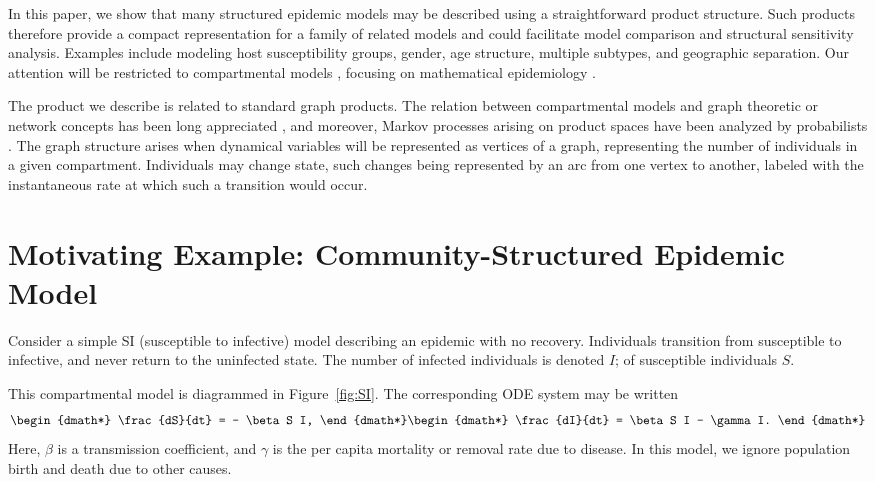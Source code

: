 \documentclass[review]{elsarticle}
\newcommand{\hl}[1]{#1}
\begin{document}
In this paper, we show that many structured epidemic models
may be described using a straightforward
product structure.  Such products therefore provide a compact representation for
a family of related models and could facilitate model comparison
and structural sensitivity analysis.
Examples include modeling
host susceptibility groups, gender, age structure, multiple subtypes, and geographic separation.
Our attention will be restricted to compartmental models
\cite{jacquez1972compartmental,matis2012stochastic,anderson1991infectious},
focusing on mathematical epidemiology \cite{kermack1927contribution,bailey1975,hethcote1976,anderson-may1991,hethcote1994,hethcote2000,vandendriessche-watmough2002,martcheva2015}.

The product we describe is related to standard graph products.
The relation between compartmental models and graph theoretic or
network concepts has been long appreciated \cite{mason56,lewis77}, and moreover,
Markov processes arising on product spaces have been analyzed by
probabilists \cite{vasershtein69}.  The graph
structure arises when
dynamical variables will be represented as vertices of a graph, 
representing the number of individuals in a given compartment.
Individuals
may change state, such changes being represented by an arc from one
vertex to another, labeled with the instantaneous rate at which such a transition
would occur.  

\section{Motivating Example: Community-Structured Epidemic Model}

Consider a simple SI (susceptible to infective) model describing an epidemic with no
recovery.  Individuals transition from
susceptible to infective, and never return to the uninfected state.  The number
of infected individuals is denoted $I$; of susceptible individuals $S$.

This compartmental model is diagrammed in \hl{Figure~\mbox{\ref{fig:SI}}}.
The corresponding ODE system may be written
\begin{dgroup*}
\begin{dmath*}
 \frac{dS}{dt} = - \beta S I,
\end{dmath*}\begin{dmath*}
 \frac{dI}{dt} = \beta S I - \gamma I.
\end{dmath*}
\end{dgroup*}
Here,
$\beta$ is a transmission coefficient, and
$\gamma$ is the per capita mortality or removal rate due to disease.  In this model,
we ignore population birth and death due to other causes.
\end{document}
